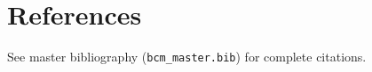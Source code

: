 \section{References}
\label{sec:nob-references}

See master bibliography (\texttt{bcm\_master.bib}) for complete citations.

\nocite{bcm_master}

